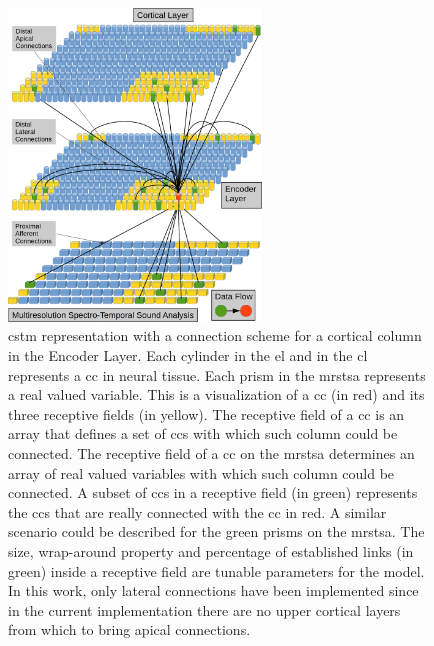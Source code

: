 \documentclass[11pt,a4paper]{article}
\begin{document}
\begin{figure}[h!]
    \centering
    \includegraphics[width=0.6\textwidth]{EncoderColumnConnections.png}
    \caption{\gls{cstm} representation with a connection scheme for a cortical column in the Encoder Layer.
    Each cylinder in the \gls{el} and in the \gls{cl} represents a \gls{cc} in neural tissue.
    Each prism in the \gls{mrstsa} represents a real valued variable.
    This is a visualization of a \gls{cc} (in red) and its three receptive fields (in yellow).
    The receptive field of a \gls{cc} is an array that defines a set of \glspl{cc}
    with which such column could be connected.
    The receptive field of a \gls{cc} on the \gls{mrstsa} determines an array of real valued variables
    with which such column could be connected.
    A subset of \glspl{cc} in a receptive field (in green) represents the \glspl{cc} that are really
    connected with the \gls{cc} in red. A similar scenario could be described for the green prisms on
    the \gls{mrstsa}.
    The size, wrap-around property and percentage of established links (in green) inside a receptive field are tunable parameters for the model.
    In this work, only lateral connections have been implemented since in the current implementation there are no upper cortical layers from which
    to bring apical connections.}
    \label{fig:EncoderColumnConnections}
\end{figure}

\end{document}
